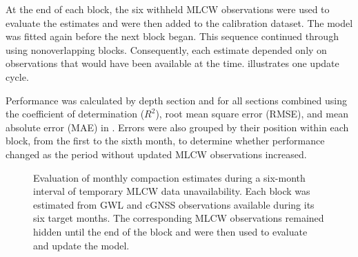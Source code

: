 At the end of each block, the six withheld MLCW observations were used to evaluate the estimates and were then added to the calibration dataset. The model was fitted again before the next block began. This sequence continued through  using nonoverlapping blocks. Consequently, each estimate depended only on observations that would have been available at the time.  illustrates one update cycle.

Performance was calculated by depth section and for all sections combined using the coefficient of determination ($R^2$), root mean square error (RMSE), and mean absolute error (MAE) in . Errors were also grouped by their position within each block, from the first to the sixth month, to determine whether performance changed as the period without updated MLCW observations increased.

\begin{figure}[htbp]
  \centering
  \caption{Evaluation of monthly compaction estimates during a six-month interval of temporary MLCW data unavailability. Each block was estimated from GWL and cGNSS observations available during its six target months. The corresponding MLCW observations remained hidden until the end of the block and were then used to evaluate and update the model.}
  \label{fig:delayed_observation_design}
\end{figure}

